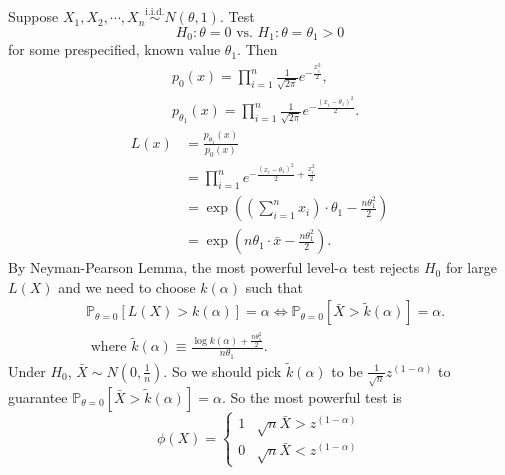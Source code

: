 \documentclass[a4paper]{article}
\begin{document}
\begin{eg}
	Suppose $X_1, X_2, \cdots, X_n \stackrel{\text{i.i.d.}}{\sim} N(\theta,1)$. Test
	\begin{equation*}
		H_0: \theta = 0 \text{ vs. } H_1: \theta = \theta_1 > 0
	\end{equation*}
	for some prespecified, known value $\theta_1$. Then
	\begin{equation*}
		\begin{aligned}
			& p_{0}(x) = \prod\limits_{i=1}^n \frac{1}{\sqrt{2\pi}} e^{-\frac{x_i^2}{2}}, \\
			& p_{\theta_1}(x) = \prod\limits_{i=1}^n \frac{1}{\sqrt{2\pi}} e^{-\frac{(x_i - \theta_1)^2}{2}}.
		\end{aligned}
	\end{equation*}
	\begin{equation*}
		\begin{aligned}
			L(x) &= \frac{p_{\theta_1}(x)}{p_{0}(x)} \\
				 &= \prod\limits_{i=1}^n e^{-\frac{(x_i - \theta_1)^2}{2} + \frac{x_i^2}{2}} \\
				 &= \exp\left(\left(\sum\limits_{i=1}^n x_i\right) \cdot \theta_1 - \frac{n\theta_1^2}{2}\right) \\
				 &= \exp\left(n\theta_1\cdot \bar{x} - \frac{n\theta_1^2}{2}\right).
		\end{aligned}
	\end{equation*}
	By Neyman-Pearson Lemma, the most powerful level-$\alpha$ test rejects $H_0$ for large $L(X)$
	and we need to choose $k(\alpha)$ such that
	\begin{equation*}
		\begin{aligned}
			& \mathbb{P}_{\theta = 0}[L(X) > k(\alpha)] = \alpha \iff \mathbb{P}_{\theta = 0}[\bar{X} > \tilde{k}(\alpha)] = \alpha. \\
			& \text{ where } \tilde{k}(\alpha) \equiv \frac{\log k(\alpha) + \frac{n\theta_1^2}{2}}{n\theta_1}.
		\end{aligned}
	\end{equation*}
	Under $H_0$, $\bar{X} \sim N(0,\frac{1}{n})$. So we should pick $\tilde{k}(\alpha)$ to be $\frac{1}{\sqrt{n}}z^{(1-\alpha)}$ to guarantee $\mathbb{P}_{\theta = 0}[\bar{X} > \tilde{k}(\alpha)] = \alpha$. So the most powerful test is
	\begin{equation}
			\phi (X) =\left\{ 
		\begin{array}{ll}
			1 & \sqrt{n}\bar{X} > z^{(1-\alpha)} \\
			0 & \sqrt{n}\bar{X} < z^{(1-\alpha)}
		\end{array} \right.		
	\end{equation}
\end{eg}
\end{document}
